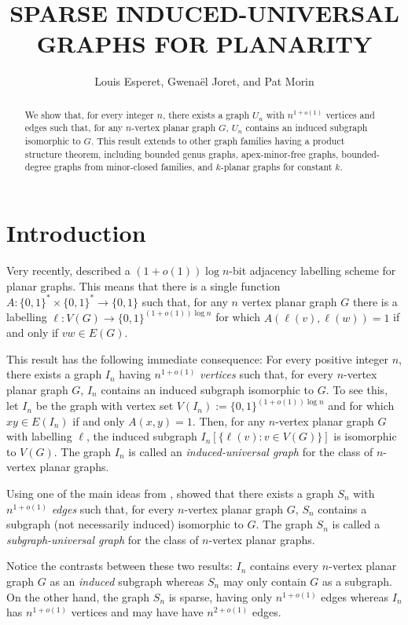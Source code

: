 \documentclass{patmorin}
\title{\MakeUppercase{Sparse Induced-Universal Graphs for Planarity}}
\author{Louis Esperet, Gwenaël Joret, and Pat Morin}
\begin{document}
\maketitle

\begin{abstract}
    We show that, for every integer $n$, there exists a graph $U_n$ with $n^{1+o(1)}$ vertices and edges such that, for any $n$-vertex planar graph $G$, $U_n$ contains an induced subgraph isomorphic to $G$.  This result extends to other graph families having a product structure theorem, including bounded genus graphs, apex-minor-free graphs, bounded-degree graphs from minor-closed families, and $k$-planar graphs for constant $k$.
\end{abstract}

\section{Introduction}

Very recently, \citet{dujmovic.esperet.ea:adjacency} described a $(1+o(1))\log n$-bit adjacency labelling scheme for planar graphs.  This means that there is a single function $A:\{0,1\}^*\times\{0,1\}^* \to\{0,1\}$ such that, for any $n$ vertex planar graph $G$ there is a labelling $\ell:V(G)\to\{0,1\}^{(1+o(1))\log n}$ for which $A(\ell(v),\ell(w))=1$ if and only if $vw\in E(G)$.

This result has the following immediate consequence: For every positive integer $n$, there exists a graph $I_n$ having $n^{1+o(1)}$ \emph{vertices} such that, for every $n$-vertex planar graph $G$, $I_n$ contains an induced subgraph isomorphic to $G$.  To see this, let $I_n$ be the graph with vertex set $V(I_n):=\{0,1\}^{(1+o(1))\log n}$ and for which $xy\in E(I_n)$ if and only $A(x,y)=1$.  Then, for any $n$-vertex planar graph $G$ with labelling $\ell$, the induced subgraph $I_n[\{\ell(v):v\in V(G)\}]$ is isomorphic to $V(G)$.  The graph $I_n$ is called an \emph{induced-universal graph} for the class of $n$-vertex planar graphs.

Using one of the main ideas from \cite{dujmovic.esperet.ea:adjacency}, \citet{esperet.joret.ea:sparse} showed that there exists a graph $S_n$ with $n^{1+o(1)}$ \emph{edges} such that, for every $n$-vertex planar graph $G$, $S_n$ contains a subgraph (not necessarily induced) isomorphic to $G$.  The graph $S_n$ is called a \emph{subgraph-universal graph} for the class of $n$-vertex planar graphs.

Notice the contrasts between these two results: $I_n$ contains every $n$-vertex planar graph $G$ as an \emph{induced} subgraph whereas $S_n$ may only contain $G$ as a subgraph.  On the other hand, the graph $S_n$ is sparse, having only $n^{1+o(1)}$ edges whereas $I_n$ has $n^{1+o(1)}$ vertices and may have have $n^{2+o(1)}$ edges.
\end{document}
